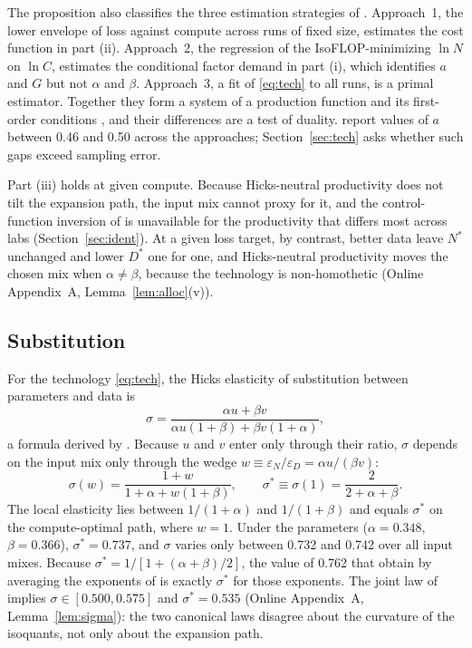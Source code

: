 The proposition also classifies the three estimation strategies of \citet{hoffmann2022training}. Approach~1, the
lower envelope of loss against compute across runs of fixed size, estimates the cost function in part (ii).
Approach~2, the regression of the IsoFLOP-minimizing $\ln N$ on $\ln C$, estimates the conditional factor demand in
part (i), which identifies $a$ and $G$ but not $\alpha$ and $\beta$. Approach~3, a fit of \eqref{eq:tech} to all
runs, is a primal estimator. Together they form a system of a production function and its first-order conditions
\citep{klump2007factor,leonledesma2010identifying}, and their differences are a test of duality.
\citet{hoffmann2022training} report values of $a$ between 0.46 and 0.50 across the approaches;
Section~\ref{sec:tech} asks whether such gaps exceed sampling error.

Part (iii) holds at given compute. Because Hicks-neutral productivity does not tilt the expansion path, the input mix
cannot proxy for it, and the control-function inversion of \citet{olley1996dynamics} is unavailable for the
productivity that differs most across labs (Section~\ref{sec:ident}). At a given loss target, by contrast, better data
leave $N^*$ unchanged and lower $D^*$ one for one, and Hicks-neutral productivity moves the chosen mix when
$\alpha\neq\beta$, because the technology is non-homothetic (Online Appendix~A, Lemma~\ref{lem:alloc}(v)).

\subsection{Substitution}\label{sec:framework:sigma}

For the technology \eqref{eq:tech}, the Hicks elasticity of substitution between parameters and data is
\begin{equation}\label{eq:sigma}
\sigma=\frac{\alpha u+\beta v}{\alpha u(1+\beta)+\beta v(1+\alpha)},
\end{equation}
a formula derived by \citet{hao2026theory}. Because $u$ and $v$ enter only through their ratio, $\sigma$ depends on
the input mix only through the wedge $w\equiv\varepsilon_N/\varepsilon_D=\alpha u/(\beta v)$:
\begin{equation}\label{eq:sigmaw}
\sigma(w)=\frac{1+w}{1+\alpha+w(1+\beta)},\qquad
\sigma^*\equiv\sigma(1)=\frac{2}{2+\alpha+\beta}.
\end{equation}
The local elasticity lies between $1/(1+\alpha)$ and $1/(1+\beta)$ and equals $\sigma^*$ on the compute-optimal path,
where $w=1$. Under the \citet{besiroglu2024chinchilla} parameters ($\alpha=0.348$, $\beta=0.366$), $\sigma^*=0.737$,
and $\sigma$ varies only between 0.732 and 0.742 over all input mixes. Because $\sigma^*=1/[1+(\alpha+\beta)/2]$, the
value of 0.762 that \citet{hao2026theory} obtain by averaging the exponents of \citet{hoffmann2022training} is exactly
$\sigma^*$ for those exponents. The joint law of \citet{kaplan2020scaling} implies $\sigma\in[0.500,0.575]$ and
$\sigma^*=0.535$ (Online Appendix~A, Lemma~\ref{lem:sigma}): the two canonical laws disagree about the curvature of
the isoquants, not only about the expansion path.

